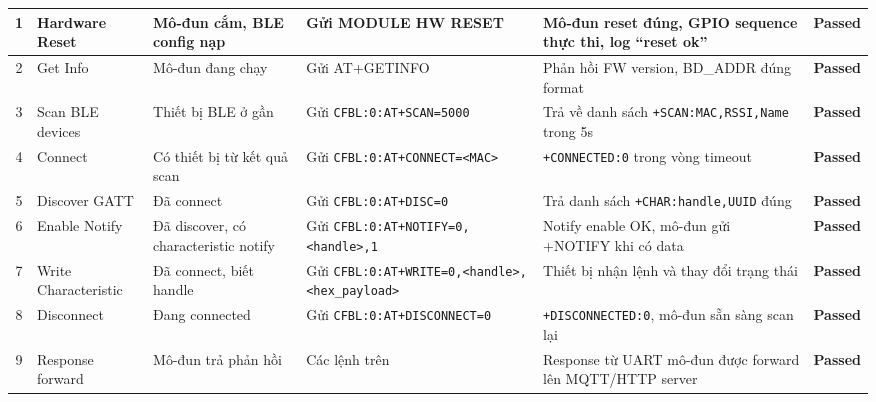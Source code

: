 \begin{longtable}{|c|p{}|p{}|p{}|p{}|c|}
            1 & Hardware Reset & Mô-đun cắm, BLE config nạp & Gửi MODULE HW RESET & Mô-đun reset đúng, GPIO sequence thực thi, log ``reset ok'' & \textcolor{modern_blue}{\textbf{Passed}} \\ \hline
            2 & Get Info & Mô-đun đang chạy & Gửi AT+GETINFO & Phản hồi FW version, BD\_ADDR đúng format & \textcolor{modern_blue}{\textbf{Passed}} \\ \hline
            3 & Scan BLE devices & Thiết bị BLE ở gần & Gửi \texttt{CFBL:0:}\newline\texttt{AT+SCAN=5000} & Trả về danh sách \texttt{+SCAN:MAC,RSSI,}\newline\texttt{Name} trong 5s & \textcolor{modern_blue}{\textbf{Passed}} \\ \hline
            4 & Connect & Có thiết bị từ kết quả scan & Gửi \texttt{CFBL:0:}\newline\texttt{AT+CONNECT=}\newline\texttt{<MAC>} & \texttt{+CONNECTED:0} trong vòng timeout & \textcolor{modern_blue}{\textbf{Passed}} \\ \hline
            5 & Discover GATT & Đã connect & Gửi \texttt{CFBL:0:}\newline\texttt{AT+DISC=0} & Trả danh sách \texttt{+CHAR:}\newline\texttt{handle,UUID} đúng & \textcolor{modern_blue}{\textbf{Passed}} \\ \hline
            6 & Enable Notify & Đã discover, có characteristic notify & Gửi \texttt{CFBL:0:}\newline\texttt{AT+NOTIFY=0,}\newline\texttt{<handle>,1} & Notify enable OK, mô-đun gửi +NOTIFY khi có data & \textcolor{modern_blue}{\textbf{Passed}} \\ \hline
            7 & Write Characteristic & Đã connect, biết handle & Gửi \texttt{CFBL:0:}\newline\texttt{AT+WRITE=0,}\newline\texttt{<handle>,}\newline\texttt{<hex\_payload>} & Thiết bị nhận lệnh và thay đổi trạng thái & \textcolor{modern_blue}{\textbf{Passed}} \\ \hline
            8 & Disconnect & Đang connected & Gửi \texttt{CFBL:0:}\newline\texttt{AT+DISCONNECT=0} & \texttt{+DISCONNECTED:0}, mô-đun sẵn sàng scan lại & \textcolor{modern_blue}{\textbf{Passed}} \\ \hline
            9 & Response forward & Mô-đun trả phản hồi & Các lệnh trên & Response từ UART mô-đun được forward lên MQTT/HTTP server & \textcolor{modern_blue}{\textbf{Passed}} \\ \hline
        \end{longtable}

